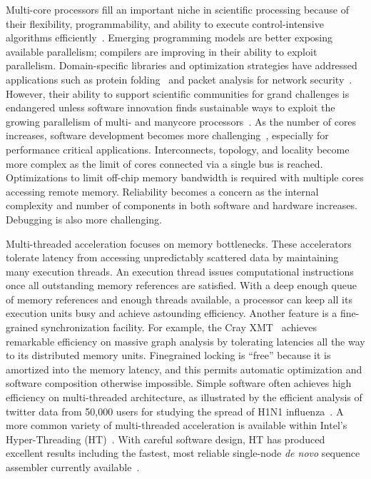 Multi-core processors fill an important niche in scientific processing because of their flexibility,
programmability, and ability to execute control-intensive algorithms efficiently~\cite{Kang2009,Williams2009,aparna.fmm}.
Emerging programming models are better exposing available parallelism; compilers are improving
in their ability to exploit parallelism. Domain-specific libraries and optimization strategies have
addressed applications such as protein folding~\cite{5160922} and packet analysis for network security~\cite{fusco:2010:imc}.
However, their ability to support scientific communities for grand challenges is endangered unless
software innovation finds sustainable ways to exploit the growing parallelism of multi- and manycore
processors~\cite{patternson:2010:spectrum}. As the number of cores increases, software development becomes more
challenging~\cite{conf/sc/MattsonRLBHKHVBRD10,Asanovic:2009:VPC:1562764.1562783}, especially for performance critical applications. Interconnects, topology,
and locality become more complex as the limit of cores connected via a single bus is reached.
Optimizations to limit off-chip memory bandwidth is required with multiple cores accessing remote memory. 
Reliability becomes a concern as the internal complexity and number of components in
both software and hardware increases. Debugging is also more challenging.

Multi-threaded acceleration focuses on memory bottlenecks. These accelerators tolerate latency
from accessing unpredictably scattered data by maintaining many execution threads. An execution
thread issues computational instructions once all outstanding memory references are satisfied. With
a deep enough queue of memory references and enough threads available, a processor can keep
all its execution units busy and achieve astounding efficiency. Another feature is a fine-grained
synchronization facility. 
For example, the Cray XMT~\cite{CrayInc.2007} achieves remarkable efficiency on
massive graph analysis by tolerating latencies all the way to its distributed memory units. Finegrained
locking is ``free'' because it is amortized into the memory latency, and this permits automatic
optimization and software composition otherwise impossible. 
Simple software often achieves high
efficiency on multi-threaded architecture, as illustrated by the efficient analysis of twitter data
from 50,000 users for studying the spread of H1N1 influenza~\cite{Ediger2010a}. 
A more common variety of
multi-threaded acceleration is available within Intel's Hyper-Threading (HT)~\cite{IntelCorp.2002,Riedy2011b,pasqual}. 
With
careful software design, HT has produced excellent results including the fastest, most reliable
single-node \textit{de novo} sequence assembler currently available~\cite{pasqual}.

